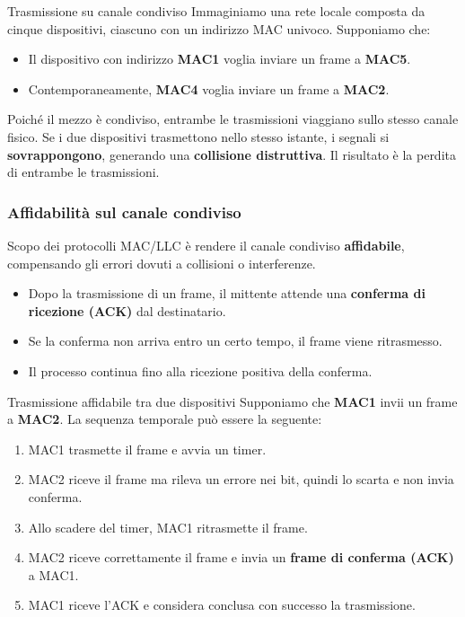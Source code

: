 \documentclass[a4paper,12pt]{report}
\begin{document}
\begin{esempiobox}{Trasmissione su canale condiviso}
Immaginiamo una rete locale composta da cinque dispositivi, ciascuno con un indirizzo MAC univoco.  
Supponiamo che:
\begin{itemize}
    \item Il dispositivo con indirizzo \textbf{MAC1} voglia inviare un frame a \textbf{MAC5}.
    \item Contemporaneamente, \textbf{MAC4} voglia inviare un frame a \textbf{MAC2}.
\end{itemize}

Poiché il mezzo è condiviso, entrambe le trasmissioni viaggiano sullo stesso canale fisico.  
Se i due dispositivi trasmettono nello stesso istante, i segnali si \textbf{sovrappongono}, generando una \textbf{collisione distruttiva}.  
Il risultato è la perdita di entrambe le trasmissioni.
\end{esempiobox}

\newpage

\subsubsection*{Affidabilità sul canale condiviso}

Scopo dei protocolli MAC/LLC è rendere il canale condiviso \textbf{affidabile}, compensando gli errori dovuti a collisioni o interferenze.

\begin{itemize}
    \item Dopo la trasmissione di un frame, il mittente attende una \textbf{conferma di ricezione (ACK)} dal destinatario.
    \item Se la conferma non arriva entro un certo tempo, il frame viene ritrasmesso.
    \item Il processo continua fino alla ricezione positiva della conferma.
\end{itemize}


\begin{esempiobox}{Trasmissione affidabile tra due dispositivi}
Supponiamo che \textbf{MAC1} invii un frame a \textbf{MAC2}.  
La sequenza temporale può essere la seguente:
\begin{enumerate}
    \item MAC1 trasmette il frame e avvia un timer.
    \item MAC2 riceve il frame ma rileva un errore nei bit, quindi lo scarta e non invia conferma.
    \item Allo scadere del timer, MAC1 ritrasmette il frame.
    \item MAC2 riceve correttamente il frame e invia un \textbf{frame di conferma (ACK)} a MAC1.
    \item MAC1 riceve l’ACK e considera conclusa con successo la trasmissione.
\end{enumerate}
\end{esempiobox}
\end{document}
